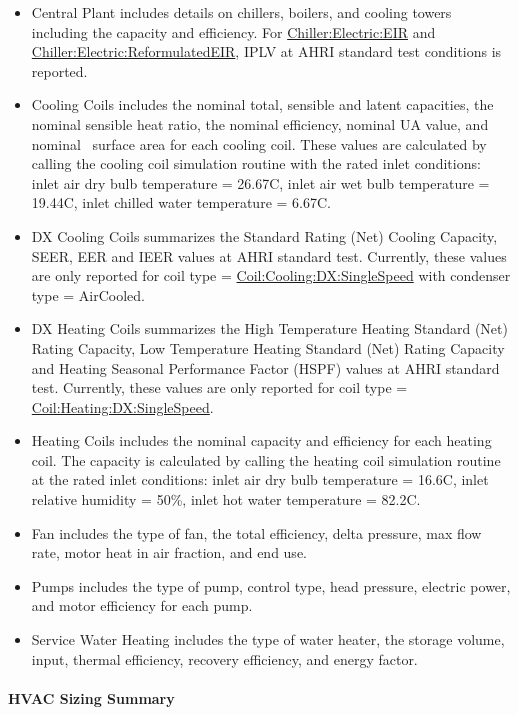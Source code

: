 \begin{itemize}
\item
  Central Plant includes details on chillers, boilers, and cooling towers including the capacity and efficiency. For \hyperref[chillerelectriceir]{Chiller:Electric:EIR} and \hyperref[chillerelectricreformulatedeir]{Chiller:Electric:ReformulatedEIR}, IPLV at AHRI standard test conditions is reported.
\item
  Cooling Coils includes the nominal total, sensible and latent capacities, the nominal sensible heat ratio, the nominal efficiency, nominal UA value, and nominal~ surface area for each cooling coil. These values are calculated by calling the cooling coil simulation routine with the rated inlet conditions: inlet air dry bulb temperature = 26.67C, inlet air wet bulb temperature = 19.44C, inlet chilled water temperature = 6.67C.
\item
  DX Cooling Coils summarizes the Standard Rating (Net) Cooling Capacity, SEER, EER and IEER values at AHRI standard test. Currently, these values are only reported for coil type = \hyperref[coilcoolingdxsinglespeed]{Coil:Cooling:DX:SingleSpeed} with condenser type = AirCooled.
\item
  DX Heating Coils summarizes the High Temperature Heating Standard (Net) Rating Capacity, Low Temperature Heating Standard (Net) Rating Capacity and Heating Seasonal Performance Factor (HSPF) values at AHRI standard test. Currently, these values are only reported for coil type = \hyperref[coilheatingdxsinglespeed]{Coil:Heating:DX:SingleSpeed}.
\item
  Heating Coils includes the nominal capacity and efficiency for each heating coil. The capacity is calculated by calling the heating coil simulation routine at the rated inlet conditions: inlet air dry bulb temperature = 16.6C, inlet relative humidity = 50\%, inlet hot water temperature = 82.2C.
\item
  Fan includes the type of fan, the total efficiency, delta pressure, max flow rate, motor heat in air fraction, and end use.
\item
  Pumps includes the type of pump, control type, head pressure, electric power, and motor efficiency for each pump.
\item
  Service Water Heating includes the type of water heater, the storage volume, input, thermal efficiency, recovery efficiency, and energy factor.
\end{itemize}

\paragraph{HVAC Sizing Summary}\label{hvac-sizing-summary}

